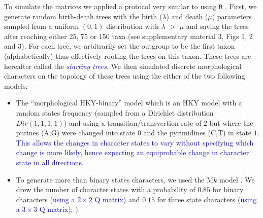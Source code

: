 \documentclass[12pt,letterpaper]{article}
\begin{document}
To simulate the matrices we applied a protocol very similar to \cite{Guillerme2016146} using \texttt{R} \citep{R}.
First, we generate random birth-death trees with the birth ($\lambda$) and death ($\mu$) parameters sampled from a uniform $(0,1)$ distribution with $\lambda$ $>$ $\mu$ \citep[\texttt{diversitree} v0.9-8;][]{fitzjohndiversitree2012} and saving the trees after reaching either 25, 75 or 150 taxa (see supplementary material 3, Figs 1, 2 and 3).
For each tree, we arbitrarily set the outgroup to be the first taxon (alphabetically) thus effectively rooting the trees on this taxon.
These trees are hereafter called the \textcolor{blue}{\textit{starting trees}}.
We then simulated discrete morphological characters on the topology of these trees using the either of the two following models:
\begin{itemize}
    \item The ``morphological HKY-binary'' model \citep{OReilly20160081} which is an HKY model \citep{HKY85} with a random states frequency (sampled from a Dirichlet distribution $Dir(1,1,1,1)$) and using a transition/transvertion rate of $2$ \citep{douadycomparison2003} but where the purines (A,G) were changed into state $0$ and the pyrimidines (C,T) in state $1$.
    \textcolor{blue}{This allows the changes in character states to vary without specifying which change is more likely, hence expecting an equiprobable change in character state in all directions.}
    \item To generate more than binary states characters, we used the M$k$ model \citep{lewisa2001}.
    We drew the number of character states with a probability of $0.85$ for binary characters \textcolor{blue}{(using a $2\times2$ Q matrix)} and $0.15$ for three state characters (\textcolor{blue}{using a $3\times3$ Q matrix);} \citealt{Guillerme2016146,ZouConvergence}). %
\end{itemize}
\end{document}
